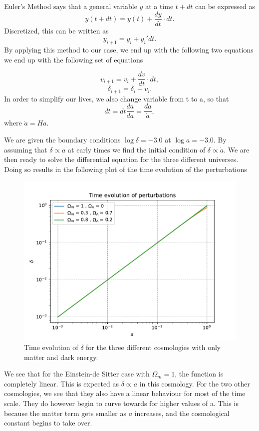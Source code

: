\documentclass[a4paper]{article}
\begin{document}
Euler's Method says that a general variable $y$ at a time $t + dt$ can be expressed as
\[
y(t + dt) = y(t) + \frac{dy}{dt} \cdot dt.
\]
Discretized, this can be written as 
\begin{equation}
    y_{i+1} = y_i + y_i'dt.
\end{equation}
By applying this method to our case, we end up with the following two equations we end up with the following set of equations

\begin{equation}
    v_{i+1} = v_i + \frac{dv}{dt}\cdot dt,
\end{equation}
\begin{equation}
    \delta_{i+1} = \delta_i + v_i.
\end{equation}
In order to simplify our lives, we also change variable from t to a, so that \[
dt = dt\frac{da}{da} = \frac{da}{\dot{a}},
\]
where $\dot{a} = H a$. 

We are given the boundary conditions $\log \delta = -3.0$ at $\log a = -3.0$. By assuming that $\delta \propto a$ at early times we find the initial condition of $\dot{\delta} \propto \dot{a}$. We are then ready to solve the differential equation for the three different universes. Doing so results in the following plot of the time evolution of the perturbations
\begin{figure}[h]
  \centering
  \includegraphics[width=0.9\linewidth]{2b.pdf}
  \caption{Time evolution of $\delta$ for the three different cosmologies with only matter and dark energy.}
  \label{fig:1}
\end{figure}

We see that for the Einstein-de Sitter case with $\Omega_m = 1$, the function is completely linear. This is expected as $\delta \propto a$ in this cosmology. For the two other cosmologies, we see that they also have a linear behaviour for most of the time scale. They do however begin to curve towards for higher values of a. This is because the matter term gets smaller as $a$ increases, and the cosmological constant begins to take over. 
\end{document}
